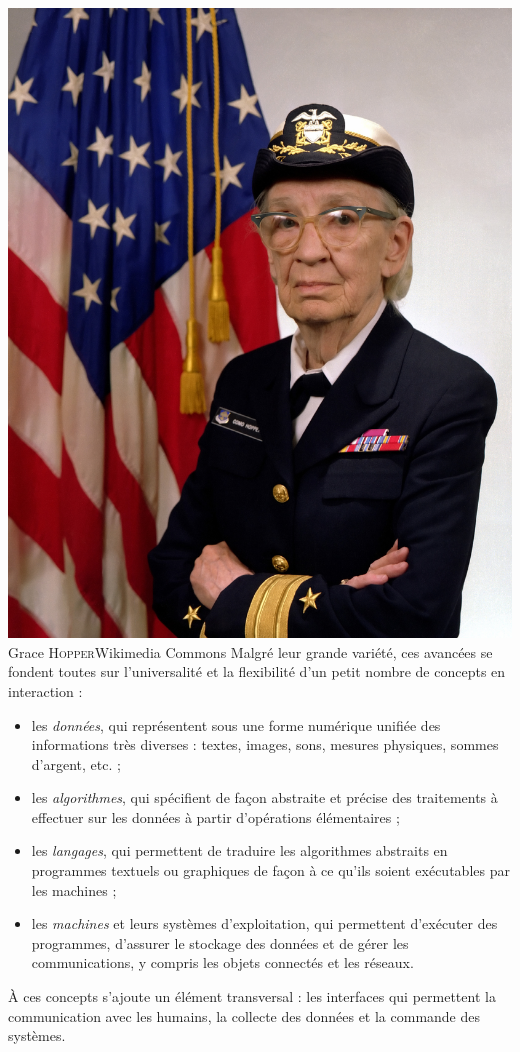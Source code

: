 {\includegraphics[width=0.725\linewidth]{./Images/Chapter00/grace-hopper.jpg}\\ Grace \textsc{Hopper}}{Wikimedia Commons}
Malgré leur grande variété, ces avancées se fondent toutes sur l’universalité et la flexibilité d’un petit nombre de concepts en interaction :
\begin{itemize}
	\item les \emph{données}, qui représentent sous une forme numérique unifiée des informations très diverses : textes, images, sons, mesures physiques, sommes d’argent, etc. ;
	\item les \emph{algorithmes}, qui spécifient de façon abstraite et précise des traitements à effectuer sur les données à partir d’opérations élémentaires ;
	\item les \emph{langages}, qui permettent de traduire les algorithmes abstraits en programmes textuels ou graphiques de façon à ce qu’ils soient exécutables par les machines ;
	\item les \emph{machines} et leurs systèmes d’exploitation, qui permettent d’exécuter des programmes, d'assurer le stockage des données et de gérer les communications, y compris les objets connectés et les réseaux.
\end{itemize}

À ces concepts s’ajoute un élément transversal : les interfaces qui permettent la communication avec les humains, la collecte des données et la commande des systèmes.


